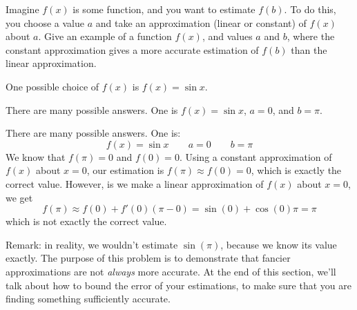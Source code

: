 \begin{question}
Imagine $f(x)$ is some function, and you want to estimate $f(b)$. To do this, you choose a value $a$ and take an approximation (linear or constant) of $f(x)$ about $a$. Give an example of a function $f(x)$, and values $a$ and $b$, where the constant approximation gives a more accurate estimation of $f(b)$ than the linear approximation.
\end{question}
\begin{hint}
One possible choice of $f(x)$ is $f(x)=\sin x$.
\end{hint}
\begin{answer} There are many possible answers. One is $f(x)=\sin x$, $a=0$, and $b=\pi$.
\end{answer}
\begin{solution}
There are many possible answers. One is:
\[f(x)=\sin x \qquad a=0 \qquad b=\pi \]
We know that $f(\pi)=0$ and $f(0)=0$. Using a constant approximation of $f(x)$ about $x=0$, our estimation is $f(\pi)\approx f(0)=0$, which is exactly the correct value. However, is we make a linear approximation of $f(x)$ about $x=0$, we get
\[
f(\pi) \approx f(0)+f'(0)(\pi-0)=\sin(0)+\cos(0)\pi=\pi
\]
which is not exactly the correct value.
\begin{center}\end{center}
Remark: in reality, we wouldn't estimate $\sin(\pi)$, because we know its value exactly. The purpose of this problem is to demonstrate that fancier approximations are not \emph{always} more accurate. At the end of this section, we'll talk about how to bound the error of your estimations, to make sure that you are finding something sufficiently accurate.
\end{solution}


